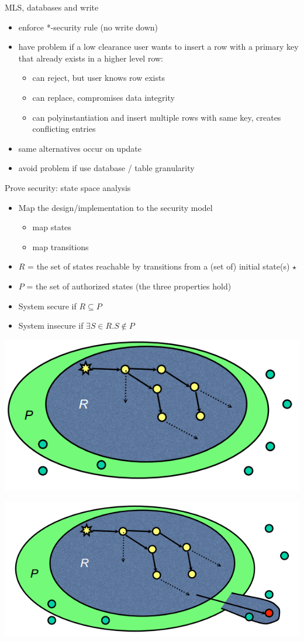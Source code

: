 \documentclass{beamer}
\begin{document}
\begin{frame}{MLS, databases and write}
  \begin{itemize}
  \item enforce *-security rule (no write down) 
  \item have problem if a low clearance user wants to 
    insert a row with a primary key that already exists 
    in a higher level row:
    \begin{itemize}
    \item can reject, but user knows row exists 
    \item can replace, compromises data integrity 
    \item can polyinstantiation and insert multiple rows with same 
      key, creates conflicting entries
    \end{itemize}
  \item same alternatives occur on update 
  \item avoid problem if use database / table granularity
  \end{itemize}
\end{frame}


\begin{frame}{Prove security: state space analysis}
  \begin{itemize}
  \item Map the design/implementation to the security model
    \begin{itemize}
      \item map states
      \item map transitions
    \end{itemize}
  \item $R$ = the set of states reachable by transitions from a
    (set of) initial state(s) $\star$
  \item $P$ = the set of authorized states (the three properties hold)
  \item System secure if $R \subseteq P$
  \item System insecure if $\exists S \in R. S \not \in P$
  \end{itemize}
   {
  \begin{center}
    \includegraphics[width=0.5\linewidth]{secure_system}
  \end{center}}
   {
  \begin{center}
    \includegraphics[width=0.5\linewidth]{insicure_system}
  \end{center}}
\end{frame}
\end{document}
